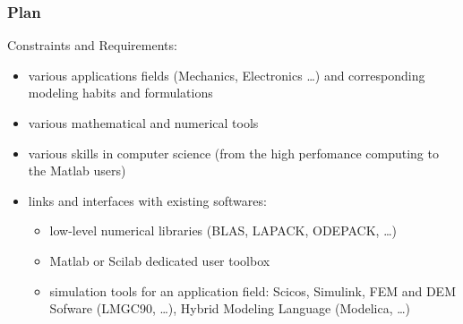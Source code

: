 \frame
{
  \frametitle{Plan}
  \pause
\vspace{1cm}
  \begin{block}{Constraints and Requirements:}
    \begin{itemize}
    \item various applications fields (Mechanics, Electronics \ldots) and corresponding modeling habits and formulations
    \item various mathematical and numerical tools
    \item various skills in computer science (from the high perfomance computing to the Matlab users)
      \pause
    \item links and interfaces with existing softwares:
      \begin{itemize}
      \item low-level numerical libraries (BLAS, LAPACK, ODEPACK, \ldots)
      \item Matlab or Scilab dedicated user toolbox
      \item simulation tools for an application field: Scicos, Simulink, FEM and DEM Sofware (LMGC90, \ldots), Hybrid Modeling Language (Modelica, \ldots)
      \end{itemize} 
    \end{itemize}
  \end{block}
}

